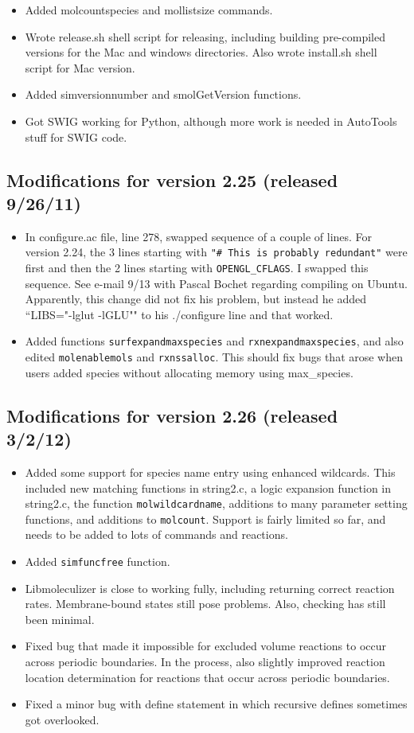 \documentclass {scrbook}
\newcommand {\ttt} {\texttt}
\begin{document}
\begin{itemize}
\item Added molcountspecies and mollistsize commands.
\item Wrote release.sh shell script for releasing, including building pre-compiled versions for the Mac and windows directories. Also wrote install.sh shell script for Mac version.
\item Added simversionnumber and smolGetVersion functions.
\item Got SWIG working for Python, although more work is needed in AutoTools stuff for SWIG code.
\end{itemize}

\subsection{Modifications for version 2.25 (released 9/26/11)}
\begin{itemize}
\item In configure.ac file, line 278, swapped sequence of a couple of lines. For version 2.24, the 3 lines starting with \ttt{"\# This is probably redundant"} were first and then the 2 lines starting with \ttt{OPENGL\_CFLAGS}. I swapped this sequence. See e-mail 9/13 with Pascal Bochet regarding compiling on Ubuntu. Apparently, this change did not fix his problem, but instead he added ``LIBS="-lglut -lGLU"" to his ./configure line and that worked.
\item Added functions \ttt{surfexpandmaxspecies} and \ttt{rxnexpandmaxspecies}, and also edited \ttt{molenablemols} and \ttt{rxnssalloc}. This should fix bugs that arose when users added species without allocating memory using max\_species.
\end{itemize}

\subsection{Modifications for version 2.26 (released 3/2/12)}
\begin{itemize}
\item Added some support for species name entry using enhanced wildcards. This included new matching functions in string2.c, a logic expansion function in string2.c, the function \ttt{molwildcardname}, additions to many parameter setting functions, and additions to \ttt{molcount}. Support is fairly limited so far, and needs to be added to lots of commands and reactions.
\item Added \ttt{simfuncfree} function.
\item Libmoleculizer is close to working fully, including returning correct reaction rates. Membrane-bound states still pose problems. Also, checking has still been minimal.
\item Fixed bug that made it impossible for excluded volume reactions to occur across periodic boundaries. In the process, also slightly improved reaction location determination for reactions that occur across periodic boundaries.
\item Fixed a minor bug with define statement in which recursive defines sometimes got overlooked.
\end{itemize}
\end{document}
